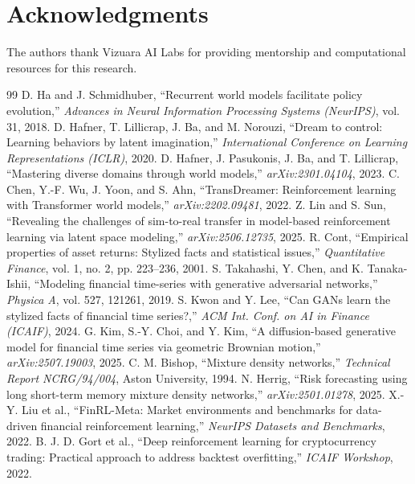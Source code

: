 \documentclass[conference]{IEEEtran}
\begin{document}
\section*{Acknowledgments}
The authors thank Vizuara AI Labs for providing mentorship and computational resources for this research.

\balance
\begin{thebibliography}{99}
 D. Ha and J. Schmidhuber, ``Recurrent world models facilitate policy evolution,'' \textit{Advances in Neural Information Processing Systems (NeurIPS)}, vol. 31, 2018.
 D. Hafner, T. Lillicrap, J. Ba, and M. Norouzi, ``Dream to control: Learning behaviors by latent imagination,'' \textit{International Conference on Learning Representations (ICLR)}, 2020.
 D. Hafner, J. Pasukonis, J. Ba, and T. Lillicrap, ``Mastering diverse domains through world models,'' \textit{arXiv:2301.04104}, 2023.
 C. Chen, Y.-F. Wu, J. Yoon, and S. Ahn, ``TransDreamer: Reinforcement learning with Transformer world models,'' \textit{arXiv:2202.09481}, 2022.
 Z. Lin and S. Sun, ``Revealing the challenges of sim-to-real transfer in model-based reinforcement learning via latent space modeling,'' \textit{arXiv:2506.12735}, 2025.
 R. Cont, ``Empirical properties of asset returns: Stylized facts and statistical issues,'' \textit{Quantitative Finance}, vol. 1, no. 2, pp. 223--236, 2001.
 S. Takahashi, Y. Chen, and K. Tanaka-Ishii, ``Modeling financial time-series with generative adversarial networks,'' \textit{Physica A}, vol. 527, 121261, 2019.
 S. Kwon and Y. Lee, ``Can GANs learn the stylized facts of financial time series?,'' \textit{ACM Int. Conf. on AI in Finance (ICAIF)}, 2024.
 G. Kim, S.-Y. Choi, and Y. Kim, ``A diffusion-based generative model for financial time series via geometric Brownian motion,'' \textit{arXiv:2507.19003}, 2025.
 C. M. Bishop, ``Mixture density networks,'' \textit{Technical Report NCRG/94/004}, Aston University, 1994.
 N. Herrig, ``Risk forecasting using long short-term memory mixture density networks,'' \textit{arXiv:2501.01278}, 2025.
 X.-Y. Liu et al., ``FinRL-Meta: Market environments and benchmarks for data-driven financial reinforcement learning,'' \textit{NeurIPS Datasets and Benchmarks}, 2022.
 B. J. D. Gort et al., ``Deep reinforcement learning for cryptocurrency trading: Practical approach to address backtest overfitting,'' \textit{ICAIF Workshop}, 2022.

\end{thebibliography}
\end{document}

